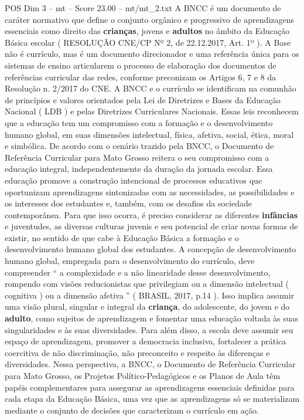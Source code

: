 \begin{textsample}{POS Dim 3 – mt – Score 23.00 – mt/mt\_2.txt}
A BNCC é um documento de caráter normativo que define o conjunto orgânico e progressivo de aprendizagens essenciais como direito das \textbf{crianças}, jovens e \textbf{adultos} no âmbito da Educação Básica escolar ( RESOLUÇÃO CNE/CP Nº 2, de 22.12.2017, Art. 1º ).
A Base não é currículo, mas é um documento direcionador e uma referência única para os sistemas de ensino articularem o processo de elaboração dos documentos de referências curricular das redes, conforme preconizam os Artigos 6, 7 e 8 da Resolução n. 2/2017 do CNE.
A BNCC e o currículo se identificam na comunhão de princípios e valores orientados pela Lei de Diretrizes e Bases da Educação Nacional ( LDB ) e pelas Diretrizes Curriculares Nacionais.
Essas leis reconhecem que a educação tem um compromisso com a formação e o desenvolvimento humano global, em suas dimensões intelectual, física, afetiva, social, ética, moral e simbólica.
De acordo com o cenário trazido pela BNCC, o Documento de Referência Curricular para Mato Grosso reitera o seu compromisso com a educação integral, independentemente da duração da jornada escolar.
Essa educação promove a construção intencional de processos educativos que oportunizam aprendizagens sintonizadas com as necessidades, as possibilidades e os interesses dos estudantes e, também, com os desafios da sociedade contemporânea.
Para que isso ocorra, é preciso considerar as diferentes \textbf{infâncias} e juventudes, as diversas culturas juvenis e seu potencial de criar novas formas de existir, no sentido de que cabe à Educação Básica a formação e o desenvolvimento humano global dos estudantes.
A concepção de desenvolvimento humano global, empregada para o desenvolvimento do currículo, deve compreender “ a complexidade e a não linearidade desse desenvolvimento, rompendo com visões reducionistas que privilegiam ou a dimensão intelectual ( cognitiva ) ou a dimensão afetiva ” ( BRASIL, 2017, p.14 ).
Isso implica assumir uma visão plural, singular e integral da \textbf{criança}, do adolescente, do jovem e do \textbf{adulto}, como sujeitos de aprendizagem e fomentar uma educação voltada às suas singularidades e às suas diversidades.
Para além disso, a escola deve assumir seu espaço de aprendizagem, promover a democracia inclusiva, fortalecer a prática coercitiva de não discriminação, não preconceito e respeito às diferenças e diversidades.
Nessa perspectiva, a BNCC, o Documento de Referência Curricular para Mato Grosso, os Projetos Político-Pedagógicos e os Planos de Aula têm papéis complementares para assegurar as aprendizagens essenciais definidas para cada etapa da Educação Básica, uma vez que as aprendizagens só se materializam mediante o conjunto de decisões que caracterizam o currículo em ação.

\end{textsample}
